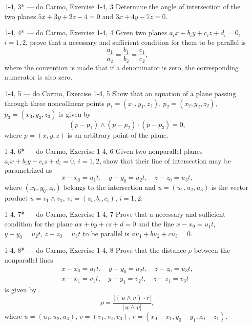 \begin{exercise}{1-4, 3* — do Carmo, Exercise 1-4, 3}
Determine the angle of intersection of the two planes $5x + 3y + 2z - 4 = 0$ and $3x + 4y - 7z = 0$.
\end{exercise}

\begin{exercise}{1-4, 4* — do Carmo, Exercise 1-4, 4}
Given two planes $a_i x + b_i y + c_i z + d_i = 0$, $i = 1, 2$, prove that a necessary and sufficient condition for them to be parallel is
\[
\frac{a_1}{a_2} = \frac{b_1}{b_2} = \frac{c_1}{c_2},
\]
where the convention is made that if a denominator is zero, the corresponding numerator is also zero.
\end{exercise}

\begin{exercise}{1-4, 5 — do Carmo, Exercise 1-4, 5}
Show that an equation of a plane passing through three noncollinear points $p_1 = (x_1, y_1, z_1)$, $p_2 = (x_2, y_2, z_2)$, $p_3 = (x_3, y_3, z_3)$ is given by
\[
(p - p_1) \wedge (p - p_2) \cdot (p - p_3) = 0,
\]
where $p = (x, y, z)$ is an arbitrary point of the plane.
\end{exercise}

\begin{exercise}{1-4, 6* — do Carmo, Exercise 1-4, 6}
Given two nonparallel planes $a_i x + b_i y + c_i z + d_i = 0$, $i = 1, 2$, show that their line of intersection may be parametrized as
\[
x - x_0 = u_1 t, \quad y - y_0 = u_2 t, \quad z - z_0 = u_3 t,
\]
where $(x_0, y_0, z_0)$ belongs to the intersection and $u = (u_1, u_2, u_3)$ is the vector product $u = v_1 \wedge v_2$, $v_i = (a_i, b_i, c_i)$, $i = 1, 2$.
\end{exercise}

\begin{exercise}{1-4, 7* — do Carmo, Exercise 1-4, 7}
Prove that a necessary and sufficient condition for the plane $ax + by + cz + d = 0$ and the line $x - x_0 = u_1 t$, $y - y_0 = u_2 t$, $z - z_0 = u_3 t$ to be parallel is $a u_1 + b u_2 + c u_3 = 0$.
\end{exercise}

\begin{exercise}{1-4, 8* — do Carmo, Exercise 1-4, 8}
Prove that the distance $\rho$ between the nonparallel lines
\[
\begin{array}{l}
x - x_0 = u_1 t, \quad y - y_0 = u_2 t, \quad z - z_0 = u_3 t, \\
x - x_1 = v_1 t, \quad y - y_1 = v_2 t, \quad z - z_1 = v_3 t
\end{array}
\]
is given by
\[
\rho = \frac{|(u \wedge v) \cdot r|}{|u \wedge v|},
\]
where $u = (u_1, u_2, u_3)$, $v = (v_1, v_2, v_3)$, $r = (x_0 - x_1, y_0 - y_1, z_0 - z_1)$.
\end{exercise}

